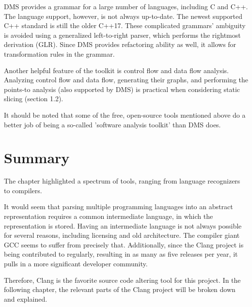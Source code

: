 DMS provides a grammar for a large number of languages, including C and C++.
The language support, however, is not always up-to-date.
The newest supported C++ standard is still the older C++17.
These complicated grammars' ambiguity is avoided using a generalized 
left-to-right parser, which performs the rightmost derivation (GLR).
Since DMS provides refactoring ability as well, it allows for transformation 
rules in the grammar.

Another helpful feature of the toolkit is control flow and data flow analysis.
Analyzing control flow and data flow, generating their graphs, and performing 
the points-to analysis (also supported by DMS) is practical when considering
static slicing (section 1.2).

It should be noted that some of the free, open-source tools mentioned above 
do a better job of being a so-called 'software analysis toolkit' than 
DMS does.

\section{Summary}

The chapter highlighted a spectrum of tools, ranging from language
recognizers to compilers.

It would seem that parsing multiple programming languages into an abstract 
representation requires a common intermediate language, in which 
the representation is stored. 
Having an intermediate language is not always possible for several reasons, 
including licensing and old architecture. 
The compiler giant GCC seems to suffer from precisely that.
Additionally, since the Clang project is being contributed to regularly, 
resulting in as many as five releases per year, 
it pulls in a more significant developer community. 

Therefore, Clang is the favorite source code altering tool for this project. 
In the following chapter, the relevant parts of the Clang project 
will be broken down and explained.
